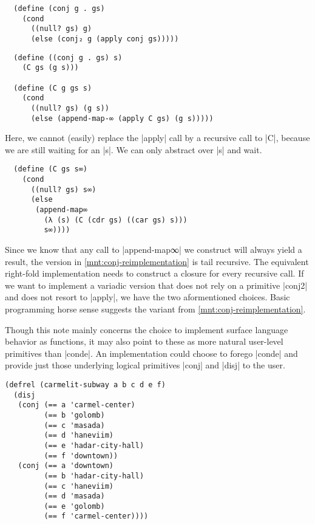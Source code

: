 \documentclass[sigplan,screen,draft,anonymous,review,natbib=false]{acmart}
\begin{document}
\begin{listing}[h]
\begin{verbatim}
  (define (conj g . gs)
    (cond
      ((null? gs) g)
      (else (conj₂ g (apply conj gs)))))
\end{verbatim}
  \caption{A right-fold variant of \rackinline|conj|.}
  \label{mnt:conj-right-fold-definition}
\end{listing}

\begin{verbatim}
  (define ((conj g . gs) s)
    (C gs (g s)))

  (define (C g gs s)
    (cond
      ((null? gs) (g s))
      (else (append-map-∞ (apply C gs) (g s)))))
\end{verbatim}

\noindent Here, we cannot (easily) replace the \rackinline|apply| call
by a recursive call to \rackinline|C|, because we are still waiting
for an \rackinline|s|. We can only abstract over \rackinline|s| and
wait.

\begin{verbatim}
  (define (C gs s∞)
    (cond
      ((null? gs) s∞)
      (else
       (append-map∞
         (λ (s) (C (cdr gs) ((car gs) s)))
         s∞))))
\end{verbatim}

Since we know that any call to \rackinline|append-map∞| we construct
will always yield a result, the version in
\cref{mnt:conj-reimplementation} is tail recursive. The equivalent
right-fold implementation needs to construct a closure for every
recursive call. If we want to implement a variadic version that does
not rely on a primitive \rackinline|conj2| and does not resort to
\rackinline|apply|, we have the two aformentioned choices. Basic
programming horse sense suggests the variant from
\cref{mnt:conj-reimplementation}.

Though this note mainly concerns the choice to implement surface
language behavior as functions, it may also point to these as more
natural user-level primitives than \rackinline|conde|. An
implementation could choose to forego \rackinline|conde| and provide
just those underlying logical primitives \rackinline|conj| and
\rackinline|disj| to the user.

\begin{listing}
  \begin{verbatim}
(defrel (carmelit-subway a b c d e f)
  (disj
   (conj (== a 'carmel-center)
         (== b 'golomb)
         (== c 'masada)
         (== d 'haneviim)
         (== e 'hadar-city-hall)
         (== f 'downtown))
   (conj (== a 'downtown)
         (== b 'hadar-city-hall)
         (== c 'haneviim)
         (== d 'masada)
         (== e 'golomb)
         (== f 'carmel-center))))
  \end{verbatim}
  \caption{A reimplemented Carmelit subway without \rackinline|conde|.}
  \label{mnt:new-carmelit}
\end{listing}
\end{document}
